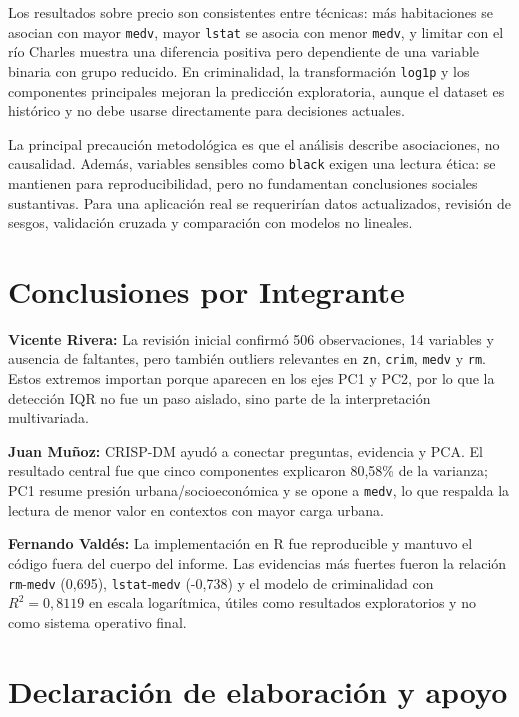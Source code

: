 \documentclass[10pt,a4paper]{article}
\begin{document}
Los resultados sobre precio son consistentes entre técnicas: más habitaciones se asocian con mayor \texttt{medv}, mayor \texttt{lstat} se asocia con menor \texttt{medv}, y limitar con el río Charles muestra una diferencia positiva pero dependiente de una variable binaria con grupo reducido. En criminalidad, la transformación \texttt{log1p} y los componentes principales mejoran la predicción exploratoria, aunque el dataset es histórico y no debe usarse directamente para decisiones actuales.

La principal precaución metodológica es que el análisis describe asociaciones, no causalidad. Además, variables sensibles como \texttt{black} exigen una lectura ética: se mantienen para reproducibilidad, pero no fundamentan conclusiones sociales sustantivas. Para una aplicación real se requerirían datos actualizados, revisión de sesgos, validación cruzada y comparación con modelos no lineales.

\section{Conclusiones por Integrante}

\textbf{Vicente Rivera:} La revisión inicial confirmó 506 observaciones, 14 variables y ausencia de faltantes, pero también outliers relevantes en \texttt{zn}, \texttt{crim}, \texttt{medv} y \texttt{rm}. Estos extremos importan porque aparecen en los ejes PC1 y PC2, por lo que la detección IQR no fue un paso aislado, sino parte de la interpretación multivariada.

\textbf{Juan Mu\~noz:} CRISP-DM ayudó a conectar preguntas, evidencia y PCA. El resultado central fue que cinco componentes explicaron 80,58\% de la varianza; PC1 resume presión urbana/socioeconómica y se opone a \texttt{medv}, lo que respalda la lectura de menor valor en contextos con mayor carga urbana.

\textbf{Fernando Valdés:} La implementación en R fue reproducible y mantuvo el código fuera del cuerpo del informe. Las evidencias más fuertes fueron la relación \texttt{rm}-\texttt{medv} (0,695), \texttt{lstat}-\texttt{medv} (-0,738) y el modelo de criminalidad con $R^{2} = 0,8119$ en escala logarítmica, útiles como resultados exploratorios y no como sistema operativo final.

\section*{Declaración de elaboración y apoyo}
\end{document}
